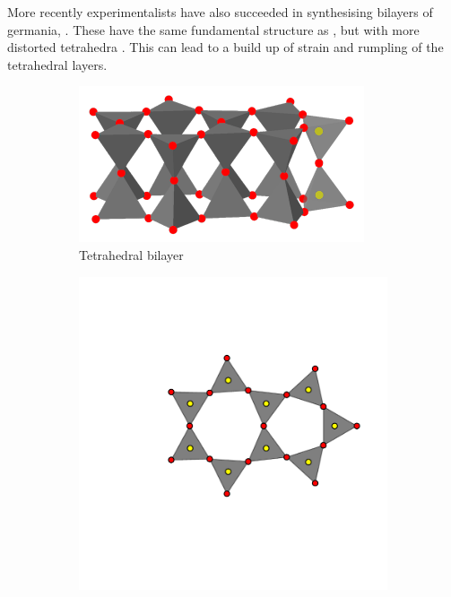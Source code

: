 More recently experimentalists have also succeeded in synthesising bilayers of germania, \geoii{} \cite{Lewandowski2018,Lewandowski2019}.
These have the same fundamental structure as \sioii{}, but with more distorted tetrahedra .
This can lead to a build up of strain and rumpling of the tetrahedral layers.

\begin{figure}[bt]
     \centering
     
     \begin{subfigure}[b]{0.3\textwidth}
         \centering
         \includegraphics[width=\textwidth]{./figures/bilayers/mx2_bilayer_1.pdf}
         \vspace{-1mm}
         \caption{Tetrahedral bilayer}
         \label{fig:bilayer1}
     \end{subfigure}
     \hfill
	\begin{subfigure}[b]{0.3\textwidth}
         \centering
         \includegraphics[width=\textwidth]{./figures/bilayers/mx2_bilayer_2.pdf}

\end{subfigure}
\end{figure}
